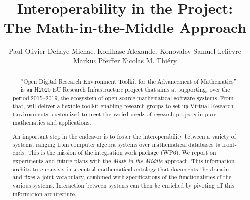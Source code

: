 \documentclass{llncs}
\title{Interoperability in the \ODK Project:\\
The Math-in-the-Middle Approach}
\author{Paul-Olivier Dehaye\inst{3} Michael Kohlhase\inst{2} Alexander
  Konovalov\inst{4} Samuel Lelièvre\inst{1} Markus
  Pfeiffer\inst{4} Nicolas M. Thiéry\inst{1}}
\institute{
  Universit\'e Paris-Sud\and
Jacobs University \and 
  University of Z\"urich \and
  University of St~Andrews
}
\begin{document}
\maketitle
\begin{abstract}
  \ODK --- ``Open Digital Research Environment Tool\-kit for the Advancement of
  Mathematics'' --- is an H2020 EU Research Infrastructure project that aims at
  supporting, over the period 2015--2019, the ecosystem of open-source mathematical
  software systems. From that, \ODK will deliver a flexible toolkit enabling research
  groups to set up Virtual Research Environments, customised to meet the varied needs of
  research projects in pure mathematics and applications.

  An important step in the \ODK endeavor is to foster the interoperability between a
  variety of systems, ranging from computer algebra systems over mathematical databases to
  front-ends. This is the mission of the integration work package (WP6). We report on
  experiments and future plans with the \emph{Math-in-the-Middle} approach. This
  information architecture consists in a central mathematical ontology that documents the
  domain and fixes a joint vocabulary, combined with specifications of the functionalities
  of the various systems. Interaction between systems can then be enriched by pivoting off
  this information architecture.
\end{abstract}








\printbibliography
\end{document}
